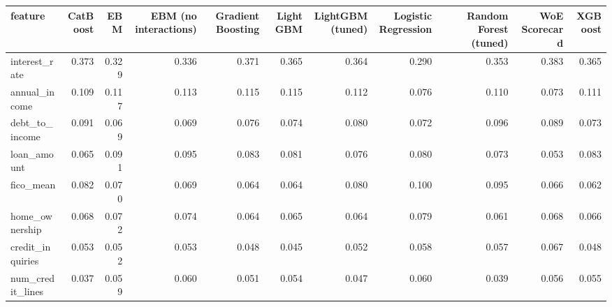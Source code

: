 \begin{tabular}{lrrrrrrrrrr}
\toprule
feature & CatBoost & EBM & EBM (no interactions) & Gradient Boosting & LightGBM & LightGBM (tuned) & Logistic Regression & Random Forest (tuned) & WoE Scorecard & XGBoost \\
\midrule
interest\_rate & 0.373 & 0.329 & 0.336 & 0.371 & 0.365 & 0.364 & 0.290 & 0.353 & 0.383 & 0.365 \\
annual\_income & 0.109 & 0.117 & 0.113 & 0.115 & 0.115 & 0.112 & 0.076 & 0.110 & 0.073 & 0.111 \\
debt\_to\_income & 0.091 & 0.069 & 0.069 & 0.076 & 0.074 & 0.080 & 0.072 & 0.096 & 0.089 & 0.073 \\
loan\_amount & 0.065 & 0.091 & 0.095 & 0.083 & 0.081 & 0.076 & 0.080 & 0.073 & 0.053 & 0.083 \\
fico\_mean & 0.082 & 0.070 & 0.069 & 0.064 & 0.064 & 0.080 & 0.100 & 0.095 & 0.066 & 0.062 \\
home\_ownership & 0.068 & 0.072 & 0.074 & 0.064 & 0.065 & 0.064 & 0.079 & 0.061 & 0.068 & 0.066 \\
credit\_inquiries & 0.053 & 0.052 & 0.053 & 0.048 & 0.045 & 0.052 & 0.058 & 0.057 & 0.067 & 0.048 \\
num\_credit\_lines & 0.037 & 0.059 & 0.060 & 0.051 & 0.054 & 0.047 & 0.060 & 0.039 & 0.056 & 0.055 \\
\bottomrule
\end{tabular}

